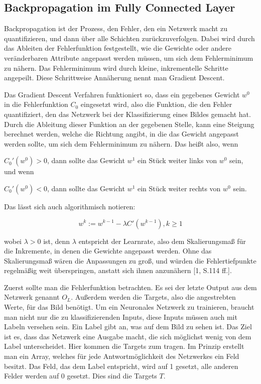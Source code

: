 \documentclass[12pt]{article}
\begin{document}
\subsection{Backpropagation im Fully Connected Layer}
Backpropagation ist der Prozess, den Fehler, den ein Netzwerk macht zu quantifizieren, und dann über alle Schichten zurückzuverfolgen. Dabei wird durch das Ableiten der Fehlerfunktion festgestellt, wie die Gewichte oder andere veränderbaren Attribute angepasst werden müssen, um sich dem Fehlerminimum zu nähern. Das Fehlerminimum wird durch kleine, inkrementelle Schritte angepeilt. Diese Schrittweise Annäherung nennt man Gradient Descent. 

Das Gradient Descent Verfahren funktioniert so, dass ein gegebenes Gewicht $w^0$ in die Fehlerfunktion $C_0$ eingesetzt wird, also die Funktion, die den Fehler quantifiziert, den das Netzwerk bei der Klassifizierung eines Bildes gemacht hat. Durch die Ableitung dieser Funktion an der gegebenen Stelle, kann eine Steigung berechnet werden, welche die Richtung angibt, in die das Gewicht angepasst werden sollte, um sich dem Fehlerminimum zu nähern. 
Das heißt also, wenn 

$C_0'(w^0)>0$, dann sollte das Gewicht $w^1$ ein Stück weiter links von $w^0$ sein, und wenn

$C_0'(w^0)<0$, dann sollte das Gewicht $w^1$ ein Stück weiter rechts von $w^0$ sein.

Das lässt sich auch algorithmisch notieren:

$$w^k:=w^{k-1}-\lambda C'(w^{k-1}), k \geq 1$$

wobei $\lambda > 0$ ist, denn $\lambda$ entspricht der Learnrate, also dem Skalierungsmaß für die Inkremente, in denen die Gewichte angepasst werden. Ohne das Skalierungsmaß wären die Anpassungen zu groß, und würden die Fehlertiefpunkte regelmäßig weit überspringen, anstatt sich ihnen anzunähern [1, S.114 ff.]. 

Zuerst sollte man die Fehlerfunktion betrachten. 
Es sei der letzte Output aus dem Netzwerk genannt $O_L$. Außerdem werden die Targets, also die angestrebten Werte, für das Bild benötigt. Um ein Neuronales Netzwerk zu trainieren, braucht man nicht nur die zu klassifizierenden Inputs, diese Inputs müssen auch mit Labeln versehen sein. Ein Label gibt an, was auf dem Bild zu sehen ist. Das Ziel ist es, dass das Netzwerk eine Ausgabe macht, die sich möglichst wenig von dem Label unterscheidet. Hier kommen die Targets zum tragen. Im Prinzip erstellt man ein Array, welches für jede Antwortmöglichkeit des Netzwerkes ein Feld besitzt. Das Feld, das dem Label entspricht, wird auf 1 gesetzt, alle anderen Felder werden auf 0 gesetzt. Dies sind die Targets $T$.
\end{document}
